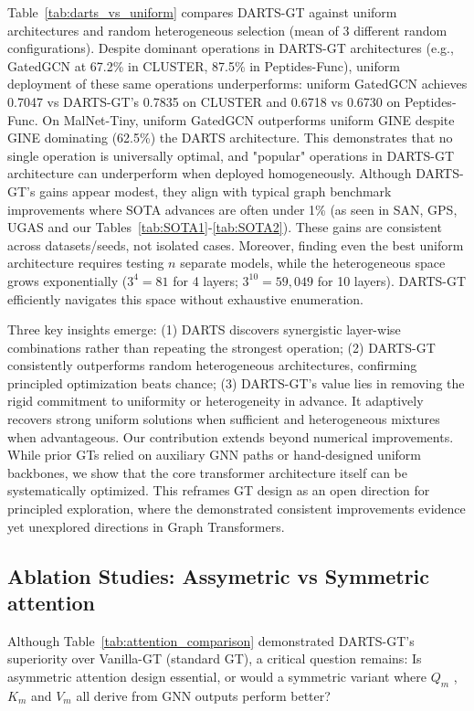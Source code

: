 \documentclass[lettersize,journal]{IEEEtran}
\begin{document}
Table~\ref{tab:darts_vs_uniform} compares DARTS-GT against uniform architectures and random heterogeneous selection (mean of 3 different random configurations). Despite dominant operations in DARTS-GT architectures (e.g., GatedGCN at 67.2\% in CLUSTER, 87.5\% in Peptides-Func), uniform deployment of these same operations underperforms: uniform GatedGCN achieves 0.7047 vs DARTS-GT's 0.7835 on CLUSTER and 0.6718 vs 0.6730 on Peptides-Func. On MalNet-Tiny, uniform GatedGCN outperforms uniform GINE despite GINE dominating (62.5\%) the DARTS architecture. This demonstrates that no single operation is universally optimal, and "popular" operations in DARTS-GT architecture can underperform when deployed homogeneously.
Although DARTS-GT's gains appear modest, they align with typical graph benchmark improvements where SOTA advances are often under 1\% (as seen in SAN, GPS, UGAS and our Tables~\ref{tab:SOTA1}-\ref{tab:SOTA2}). These gains are consistent across datasets/seeds, not isolated cases. Moreover, finding even the best uniform architecture requires testing $n$ separate models, while the heterogeneous space grows exponentially ($3^4=81$
 for 4 layers; $3^{10}=59,049$  for 10 layers). DARTS-GT efficiently navigates this space without exhaustive enumeration.

Three key insights emerge: (1) DARTS discovers synergistic layer-wise combinations rather than repeating the strongest operation; (2) DARTS-GT consistently outperforms random heterogeneous architectures, confirming principled optimization beats chance; (3) DARTS-GT's value lies in removing the rigid commitment to uniformity or heterogeneity in advance. It adaptively recovers strong uniform solutions when sufficient and heterogeneous mixtures when advantageous.
Our contribution extends beyond numerical improvements. While prior GTs relied on auxiliary GNN paths or hand-designed uniform backbones, we show that the core transformer architecture itself can be systematically optimized. This reframes GT design as an open direction for principled exploration, where the demonstrated consistent improvements evidence yet unexplored directions in Graph Transformers.
\subsection{Ablation Studies: Assymetric vs Symmetric attention}

Although Table~\ref{tab:attention_comparison} demonstrated DARTS-GT's superiority over Vanilla-GT (standard GT), a critical question remains: Is asymmetric attention design essential, or would a symmetric variant where $Q_{m}$ ,$K_{m}$ and $V_{m}$ all derive from GNN outputs perform better?
\end{document}
